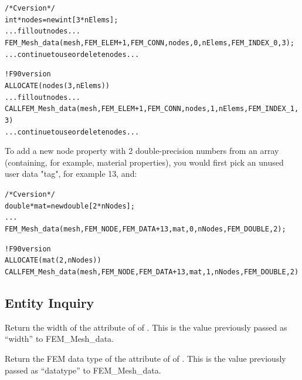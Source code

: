   \begin{alltt}
/* C version */
   int *nodes=new int[3*nElems];
   ... fill out nodes ...
   FEM\_Mesh\_data(mesh,FEM\_ELEM+1,FEM\_CONN, nodes, 0,nElems, FEM\_INDEX\_0, 3);
   ... continue to use or delete nodes ...
   
! F90 version
   ALLOCATE(nodes(3,nElems))
   ... fill out nodes ...
   CALL FEM\_Mesh\_data(mesh,FEM\_ELEM+1,FEM\_CONN, nodes, 1,nElems, FEM\_INDEX\_1, 3)
   ... continue to use or delete nodes ...
  \end{alltt}

To add a new node property with 2 double-precision numbers 
from an array  (containing, for example,
material properties), you would first pick an unused
user data "tag", for example 13, and:

  \begin{alltt}
/* C version */
   double *mat=new double[2*nNodes];
   ...
   FEM\_Mesh\_data(mesh,FEM\_NODE, FEM\_DATA+13, mat, 0,nNodes, FEM\_DOUBLE, 2);
   
! F90 version
   ALLOCATE(mat(2,nNodes))
   CALL FEM\_Mesh\_data(mesh,FEM\_NODE,FEM\_DATA+13, mat, 1,nNodes, FEM\_DOUBLE, 2)
  \end{alltt}


\subsection{Entity Inquiry}


Return the width of the attribute  of  of .
This is the value previously passed as ``width'' to FEM\_Mesh\_data.



Return the FEM data type of the attribute  of  of .
This is the value previously passed as ``datatype'' to FEM\_Mesh\_data.




